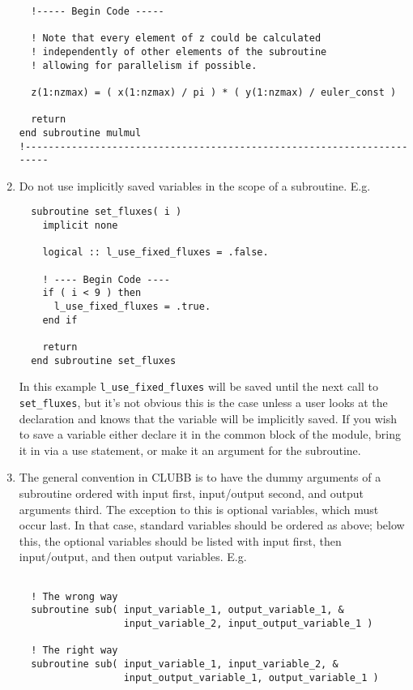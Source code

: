 \documentclass[letterpaper,12pt]{article}
\begin{document}
\begin{enumerate}
\begin{verbatim}
  !----- Begin Code -----

  ! Note that every element of z could be calculated 
  ! independently of other elements of the subroutine
  ! allowing for parallelism if possible.

  z(1:nzmax) = ( x(1:nzmax) / pi ) * ( y(1:nzmax) / euler_const )

  return
end subroutine mulmul
!-----------------------------------------------------------------------
\end{verbatim}

\item Do not use implicitly saved variables in the scope of a subroutine.  E.g.
\begin{verbatim}
  subroutine set_fluxes( i )
    implicit none

    logical :: l_use_fixed_fluxes = .false.

    ! ---- Begin Code ----
    if ( i < 9 ) then
      l_use_fixed_fluxes = .true.
    end if

    return
  end subroutine set_fluxes
\end{verbatim}
In this example \verb|l_use_fixed_fluxes| will be saved until the next call to \verb|set_fluxes|,
but it's not obvious this is the case unless a user looks at the declaration and knows that
the variable will be implicitly saved.  If you wish to save a variable either declare it in the common
block of the module, bring it in via a use statement, or make it an argument for the subroutine.

\item The general convention in CLUBB is to have the dummy arguments of a subroutine 
ordered with input first, input/output second, and output arguments third. 
The exception to this is optional variables, which must occur last.  In that case,
standard variables should be ordered as above; below this, the optional variables should
be listed with input first, then input/output, and then output variables.
\newline
E.g.
\begin{verbatim}

  ! The wrong way
  subroutine sub( input_variable_1, output_variable_1, &
                  input_variable_2, input_output_variable_1 )

  ! The right way
  subroutine sub( input_variable_1, input_variable_2, &
                  input_output_variable_1, output_variable_1 )

\end{verbatim}


\end{enumerate}
\end{document}
